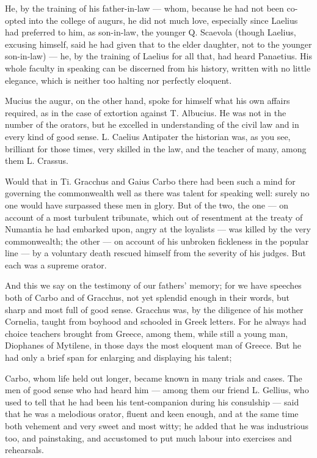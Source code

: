  He, by the training of his father-in-law — whom, because he had not been co-opted into the college of augurs, he did not much love, especially since Laelius had preferred to him, as son-in-law, the younger Q. Scaevola (though Laelius, excusing himself, said he had given that to the elder daughter, not to the younger son-in-law) — he, by the training of Laelius for all that, had heard Panaetius. His whole faculty in speaking can be discerned from his history, written with no little elegance, which is neither too halting nor perfectly eloquent.

 Mucius the augur, on the other hand, spoke for himself what his own affairs required, as in the case of extortion against T. Albucius. He was not in the number of the orators, but he excelled in understanding of the civil law and in every kind of good sense. L. Caelius Antipater the historian was, as you see, brilliant for those times, very skilled in the law, and the teacher of many, among them L. Crassus.

 Would that in Ti. Gracchus and Gaius Carbo there had been such a mind for governing the commonwealth well as there was talent for speaking well: surely no one would have surpassed these men in glory. But of the two, the one — on account of a most turbulent tribunate, which out of resentment at the treaty of Numantia he had embarked upon, angry at the loyalists — was killed by the very commonwealth; the other — on account of his unbroken fickleness in the popular line — by a voluntary death rescued himself from the severity of his judges. But each was a supreme orator.

 And this we say on the testimony of our fathers' memory; for we have speeches both of Carbo and of Gracchus, not yet splendid enough in their words, but sharp and most full of good sense. Gracchus was, by the diligence of his mother Cornelia, taught from boyhood and schooled in Greek letters. For he always had choice teachers brought from Greece, among them, while still a young man, Diophanes of Mytilene, in those days the most eloquent man of Greece. But he had only a brief span for enlarging and displaying his talent;

 Carbo, whom life held out longer, became known in many trials and cases. The men of good sense who had heard him — among them our friend L. Gellius, who used to tell that he had been his tent-companion during his consulship — said that he was a melodious orator, fluent and keen enough, and at the same time both vehement and very sweet and most witty; he added that he was industrious too, and painstaking, and accustomed to put much labour into exercises and rehearsals.

